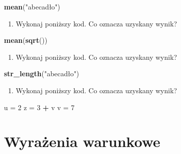\documentclass[paper=6in:9in,pagesize=pdftex,headinclude=on,footinclude=on,10pt]{scrbook}
\newenvironment{Shaded}{\begin{snugshade}}{\end{snugshade}}
\newcommand{\DecValTok}[1]{\textcolor[rgb]{0.00,0.00,0.81}{#1}}
\newcommand{\KeywordTok}[1]{\textcolor[rgb]{0.13,0.29,0.53}{\textbf{#1}}}
\newcommand{\NormalTok}[1]{#1}
\newcommand{\OperatorTok}[1]{\textcolor[rgb]{0.81,0.36,0.00}{\textbf{#1}}}
\newcommand{\StringTok}[1]{\textcolor[rgb]{0.31,0.60,0.02}{#1}}
\providecommand{\tightlist}{%
  \setlength{\itemsep}{0pt}\setlength{\parskip}{0pt}}
\begin{document}
\begin{Shaded}
\begin{Highlighting}[]
\KeywordTok{mean}\NormalTok{(}\StringTok{"abecadło"}\NormalTok{)}
\end{Highlighting}
\end{Shaded}

\begin{enumerate}
\def\labelenumi{\arabic{enumi})}
\setcounter{enumi}{10}
\tightlist
\item
  Wykonaj poniższy kod.
  Co oznacza uzyskany wynik?
\end{enumerate}

\begin{Shaded}
\begin{Highlighting}[]
\KeywordTok{mean}\NormalTok{(}\KeywordTok{sqrt}\NormalTok{())}
\end{Highlighting}
\end{Shaded}

\begin{enumerate}
\def\labelenumi{\arabic{enumi})}
\setcounter{enumi}{11}
\tightlist
\item
  Wykonaj poniższy kod.
  Co oznacza uzyskany wynik?
\end{enumerate}

\begin{Shaded}
\begin{Highlighting}[]
\KeywordTok{str_length}\NormalTok{(}\StringTok{"abecadło"}\NormalTok{)}
\end{Highlighting}
\end{Shaded}

\begin{enumerate}
\def\labelenumi{\arabic{enumi})}
\setcounter{enumi}{12}
\tightlist
\item
  Wykonaj poniższy kod.
  Co oznacza uzyskany wynik?
\end{enumerate}

\begin{Shaded}
\begin{Highlighting}[]
\NormalTok{u =}\StringTok{ }\DecValTok{2}
\NormalTok{z =}\StringTok{ }\DecValTok{3} \OperatorTok{+}\StringTok{ }\NormalTok{v}
\NormalTok{v =}\StringTok{ }\DecValTok{7}
\end{Highlighting}
\end{Shaded}

\hypertarget{warunki}{%
\chapter{Wyrażenia warunkowe}\label{warunki}}
\end{document}

